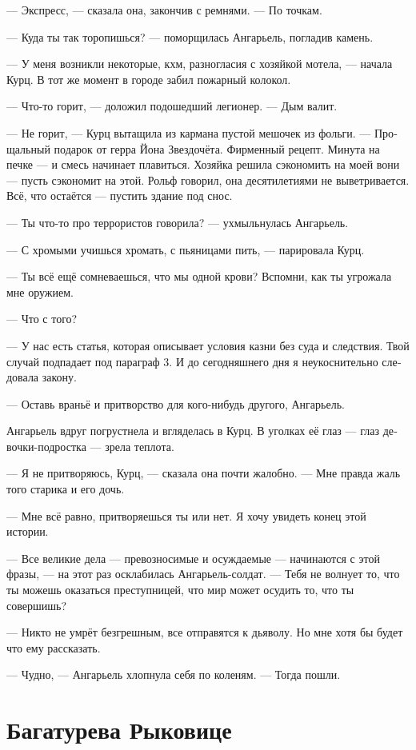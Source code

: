 \documentclass[a4paper,12pt,fleqn]{book}\usepackage{polyglossia}\setdefaultlanguage[babelshorthands=true]{russian}\setotherlanguage{english}\defaultfontfeatures{Ligatures=TeX,Mapping=tex-text}\usepackage{xcolor}\newcommand{\ml}[3]{#2}
\begin{document}
--- Экспресс, --- сказала она, закончив с ремнями.
--- По точкам.

--- Куда ты так торопишься? --- поморщилась Ангарьель, погладив камень.

--- У меня возникли некоторые, кхм, разногласия с хозяйкой мотела, --- начала Курц.
В тот же момент в городе забил пожарный колокол.

--- Что-то горит, --- доложил подошедший легионер.
--- Дым валит.

--- Не горит, --- Курц вытащила из кармана пустой мешочек из фольги.
--- Прощальный подарок от герра Йона Звездочёта.
Фирменный рецепт.
Минута на печке --- и смесь начинает плавиться.
Хозяйка решила сэкономить на моей вони --- пусть сэкономит на этой.
Рольф говорил, она десятилетиями не выветривается.
Всё, что остаётся --- пустить здание под снос.

--- Ты что-то про террористов говорила? --- ухмыльнулась Ангарьель.

--- С хромыми учишься хромать, с пьяницами пить, --- парировала Курц.

--- Ты всё ещё сомневаешься, что мы одной крови?
Вспомни, как ты угрожала мне оружием.

--- Что с того?

--- У нас есть статья, которая описывает условия казни без суда и следствия.
Твой случай подпадает под параграф 3.
И до сегодняшнего дня я неукоснительно следовала закону.

--- Оставь враньё и притворство для кого-нибудь другого, Ангарьель.

Ангарьель вдруг погрустнела и вгляделась в Курц.
В уголках её глаз --- глаз девочки-подростка --- зрела теплота.

--- Я не притворяюсь, Курц, --- сказала она почти жалобно.
--- Мне правда жаль того старика и его дочь.

--- Мне всё равно, притворяешься ты или нет.
Я хочу увидеть конец этой истории.

--- Все великие дела --- превозносимые и осуждаемые --- начинаются с этой фразы, --- на этот раз осклабилась Ангарьель-солдат.
--- Тебя не волнует то, что ты можешь оказаться преступницей, что мир может осудить то, что ты совершишь?

--- Никто не умрёт безгрешным, все отправятся к дьяволу.
Но мне хотя бы будет что ему рассказать.

--- Чудно, --- Ангарьель хлопнула себя по коленям.
--- Тогда пошли.

\chapter{Багатурева Рыковице}
\end{document}
